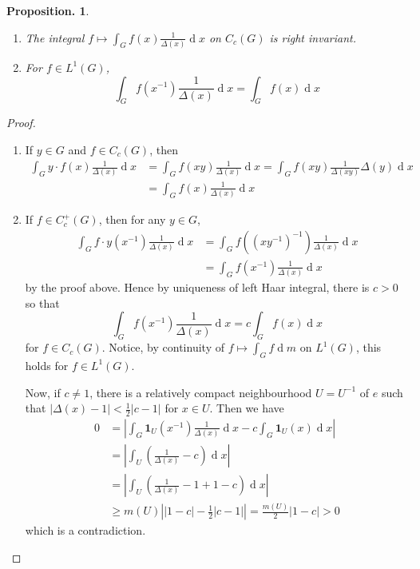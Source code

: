 \documentclass[11pt, a4paper]{memoir}
\theoremstyle{change}
\newtheorem{proposition}[theorem]{Proposition.}
\theoremstyle{plain}
\theoremstyle{nonumberplain}
\newtheorem{proof}{Proof}
\renewcommand{\d}[1]{\ensuremath{\operatorname{d}\!{#1}}}
\newcommand{\idc}[1]{\ensuremath{\mathbf{1}_{#1}}}
\numberwithin{equation}{section}
\begin{document}
\begin{proposition}
    \begin{enumerate}[nl,r]
        \item The integral $f\mapsto\int_G f(x)\frac{1}{\Delta(x)}\d{x}$ on $C_c(G)$ is right invariant.
        \item For $f\in L^1(G)$,
            \begin{equation*}
                \int_G f(x^{-1})\frac{1}{\Delta(x)}\d{x}=\int_G f(x)\d{x}
            \end{equation*}
    \end{enumerate}
\end{proposition}
\begin{proof}
    \begin{enumerate}[nl,r]
        \item If $y\in G$ and $f\in C_c(G)$, then
            \begin{align*}
                \int_G y\cdot f(x)\frac{1}{\Delta(x)}\d{x}&=\int_G f(xy)\frac{1}{\Delta(x)}\d{x}=\int_G f(xy)\frac{1}{\Delta(xy)}\Delta(y)\d{x}\\
                                                          &= \int_G f(x)\frac{1}{\Delta(x)}\d{x}
            \end{align*}
        \item If $f\in C_c^+(G)$, then for any $y\in G$,
            \begin{align*}
                \int_G f\cdot y(x^{-1})\frac{1}{\Delta(x)}\d{x} &= \int_G f((xy^{-1})^{-1})\frac{1}{\Delta(x)}\d{x}\\
                                                                &= \int_G f(x^{-1})\frac{1}{\Delta(x)}\d{x}
            \end{align*}
            by the proof above.
            Hence by uniqueness of left Haar integral, there is $c>0$ so that
            \begin{equation*}
                \int_G f(x^{-1})\frac{1}{\Delta(x)}\d{x}=c\int_G f(x)\d{x}
            \end{equation*}
            for $f\in C_c(G)$.
            Notice, by continuity of $f\mapsto\int_G f\d{m}$ on $L^1(G)$, this holds for $f\in L^1(G)$.

            Now, if $c\neq 1$, there is a relatively compact neighbourhood $U=U^{-1}$ of $e$ such that $|\Delta(x)-1|<\frac{1}{2}|c-1|$ for $x\in U$.
            Then we have
            \begin{align*}
                0 &= \left\lvert\int_G\idc{U}(x^{-1})\frac{1}{\Delta(x)}\d{x}-c\int_G\idc{U}(x)\d{x}\right\rvert\\
                  &= \left\lvert\int_U\left(\frac{1}{\Delta(x)}-c\right)\d{x}\right\rvert\\
                  &= \left\lvert\int_U\left(\frac{1}{\Delta(x)}-1+1-c\right)\d{x}\right\rvert\\
                  &\geq m(U)\left\lvert|1-c|-\frac{1}{2}|c-1|\right\rvert=\frac{m(U)}{2}|1-c|>0
            \end{align*}
            which is a contradiction.
    \end{enumerate}
\end{proof}
\end{document}
